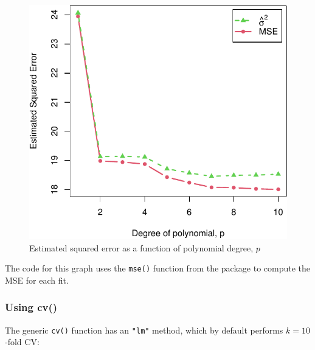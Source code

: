\documentclass[
]{jss}
\begin{document}
\begin{CodeChunk}
\begin{figure}
{\centering \includegraphics[width=1\linewidth]{JSS-article_files/figure-latex/mpg-horsepower-MSE-se-1} 

}

\caption[Estimated squared error as a function of polynomial degree, $p$]{Estimated squared error as a function of polynomial degree, $p$}\label{fig:mpg-horsepower-MSE-se}
\end{figure}
\end{CodeChunk}

The code for this graph uses the \texttt{mse()} function from the
 package to compute the MSE for each fit.

\hypertarget{using-cv}{%
\subsubsection{Using cv()}\label{using-cv}}

The generic \texttt{cv()} function has an \texttt{"lm"} method, which by
default performs \(k = 10\)-fold CV:
\end{document}

